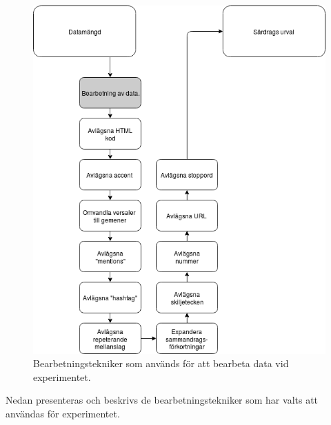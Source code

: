 \documentclass{kaumasters} %
\begin{document}
\begin{figure}[H]
\includegraphics[width=12cm]{dataset}
\centering
\caption{Bearbetningstekniker som används för att bearbeta data vid experimentet.}
\label{fig:dataset}
\end{figure}

Nedan presenteras och beskrivs de bearbetningstekniker som har valts att användas för experimentet.
\end{document}
